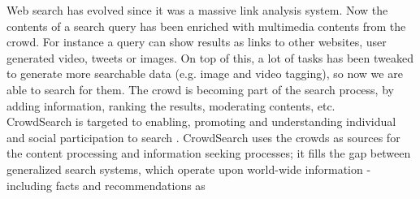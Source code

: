 
Web search has evolved since it was a massive link analysis system. Now the
contents of a search query has been enriched with multimedia contents from the
crowd. For instance a query can show results as links to other websites,
user generated video, tweets or images. On top of this, a lot of tasks has been
tweaked to generate more searchable data (e.g. image and video tagging), so now
we are able to search for them. The crowd is becoming part of the search process,
by adding information, ranking the results, moderating contents, etc.\\

CrowdSearch is targeted to enabling, promoting and understanding individual
and social participation to search \cite{fraternali2012crowdsearch}.
CrowdSearch uses the crowds as sources for the content processing and information
seeking processes; it fills the gap between generalized search systems, which
operate upon world-wide information - including facts and recommendations as
